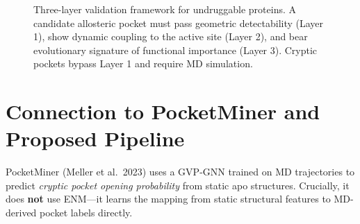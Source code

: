 \documentclass[11pt,a4paper]{article}
\begin{document}
\begin{figure}[H]
\caption{Three-layer validation framework for undruggable proteins. A candidate
allosteric pocket must pass geometric detectability (Layer 1), show dynamic
coupling to the active site (Layer 2), and bear evolutionary signature of
functional importance (Layer 3). Cryptic pockets bypass Layer 1 and require
MD simulation.}
\end{figure}

\section{Connection to PocketMiner and Proposed Pipeline}

PocketMiner (Meller et al.\ 2023) uses a GVP-GNN trained on MD trajectories
to predict \emph{cryptic pocket opening probability} from static apo structures.
Crucially, it does \textbf{not} use ENM---it learns the mapping from static
structural features to MD-derived pocket labels directly.
\end{document}
